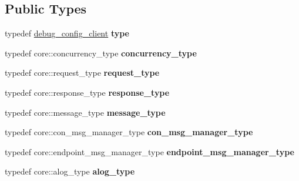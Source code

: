 \subsection*{Public Types}
\begin{DoxyCompactItemize}
\item 
\mbox{\label{structdebug__config__client_a3f806aca7fcd1a2edfcef415cd20e560}} 
typedef \mbox{\hyperlink{structdebug__config__client}{debug\+\_\+config\+\_\+client}} {\bfseries type}
\item 
\mbox{\label{structdebug__config__client_a55d8424f18283484cf48f89bdc39aad6}} 
typedef core\+::concurrency\+\_\+type {\bfseries concurrency\+\_\+type}
\item 
\mbox{\label{structdebug__config__client_a9faaed2dfa03aca1c5b4e2f1666d95f7}} 
typedef core\+::request\+\_\+type {\bfseries request\+\_\+type}
\item 
\mbox{\label{structdebug__config__client_a587ddfa30d37e0380a4743490b64ac42}} 
typedef core\+::response\+\_\+type {\bfseries response\+\_\+type}
\item 
\mbox{\label{structdebug__config__client_a4f68549a7c38f9cddb47866c5d1403ac}} 
typedef core\+::message\+\_\+type {\bfseries message\+\_\+type}
\item 
\mbox{\label{structdebug__config__client_af6d340b99f64df85383c61097f983ef1}} 
typedef core\+::con\+\_\+msg\+\_\+manager\+\_\+type {\bfseries con\+\_\+msg\+\_\+manager\+\_\+type}
\item 
\mbox{\label{structdebug__config__client_a51369e5f60139b0c3af368df1b832ca3}} 
typedef core\+::endpoint\+\_\+msg\+\_\+manager\+\_\+type {\bfseries endpoint\+\_\+msg\+\_\+manager\+\_\+type}
\item 
\mbox{\label{structdebug__config__client_a5dd3669351d46c84cff9bf989f8d2897}} 
typedef core\+::alog\+\_\+type {\bfseries alog\+\_\+type}
\item 
\mbox{\label{structdebug__config__client_a7d3549099c77db4af97bc3ce3830ffcf}} 

\end{DoxyCompactItemize}
